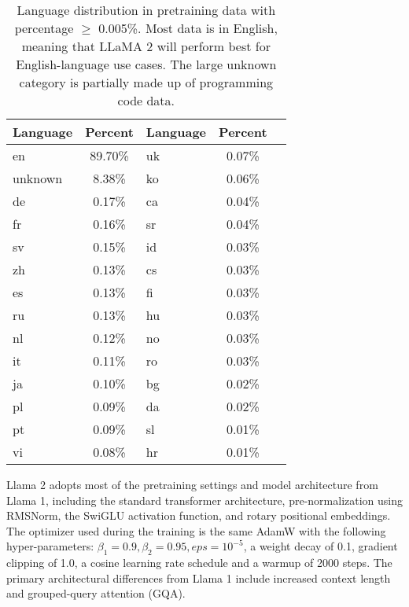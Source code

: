 \begin{table}[h!]
	\centering
	\begin{tabularx}{\textwidth}{XclcX}
		\hline
		\textbf{Language} & \textbf{Percent} & \textbf{Language} & \textbf{Percent} \\
		\hline
		en                & 89.70\%          & uk                & 0.07\%           \\
		unknown           & 8.38\%           & ko                & 0.06\%           \\
		de                & 0.17\%           & ca                & 0.04\%           \\
		fr                & 0.16\%           & sr                & 0.04\%           \\
		sv                & 0.15\%           & id                & 0.03\%           \\
		zh                & 0.13\%           & cs                & 0.03\%           \\
		es                & 0.13\%           & fi                & 0.03\%           \\
		ru                & 0.13\%           & hu                & 0.03\%           \\
		nl                & 0.12\%           & no                & 0.03\%           \\
		it                & 0.11\%           & ro                & 0.03\%           \\
		ja                & 0.10\%           & bg                & 0.02\%           \\
		pl                & 0.09\%           & da                & 0.02\%           \\
		pt                & 0.09\%           & sl                & 0.01\%           \\
		vi                & 0.08\%           & hr                & 0.01\%           \\
		\hline
	\end{tabularx}
	\caption{Language distribution in pretraining data with percentage $\geq$ 0.005\%. Most data is in English, meaning that LLaMA 2 will perform best for English-language use cases. The large unknown category is partially made up of programming code data.}
	\label{tab:llama2-pretraining-data}
\end{table}

Llama 2 adopts most of the pretraining settings and model architecture from Llama 1, including the standard transformer architecture, pre-normalization using RMSNorm, the SwiGLU activation function, and rotary positional embeddings.
The optimizer used during the training is the same AdamW with the following hyper-parameters: $\beta_1=0.9, \beta_2=0.95, eps=10^{-5}$, a weight decay of 0.1, gradient clipping of 1.0, a cosine learning rate schedule and a warmup of 2000 steps.
The primary architectural differences from Llama 1 include increased context length and grouped-query attention (GQA).

